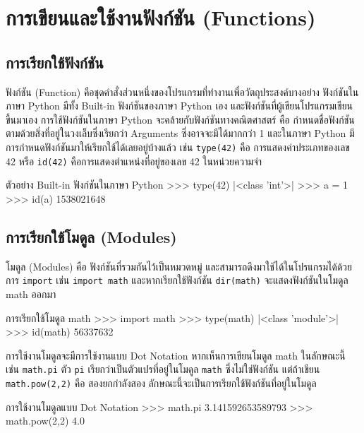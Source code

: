\chapter{การเขียนและใช้งานฟังก์ชัน (Functions)}
\section{การเรียกใช้ฟังก์ชัน}

ฟังก์ชัน (Function) คือชุดคำสั่งส่วนหนึ่งของโปรแกรมที่ทำงานเพื่อวัตถุประสงค์บางอย่าง ฟังก์ชันในภาษา Python มีทั้ง Built-in ฟังก์ชันของภาษา Python เอง และฟังก์ชันที่ผู้เขียนโปรแกรมเขียนขึ้นมาเอง การใช้ฟังก์ชันในภาษา Python จะคล้ายกับฟังก์ชันทางคณิตศาสตร์ คือ กำหนดชื่อฟังก์ชันตามด้วยสิ่งที่อยู่ในวงเล็บซึ่งเรียกว่า Arguments ซึ่งอาจจะมีได้มากกว่า 1 และในภาษา Python มีการกำหนดฟังก์ชันมาให้เรียกใช้ได้เลยอยู่บ้างแล้ว เช่น \texttt{type(42)} คือ การแสดงค่าประเภทของเลข 42 หรือ \texttt{id(42)} คือการแสดงตำแหน่งที่อยู่ของเลข 42 ในหน่วยความจำ

\begin{codelist}{ตัวอย่าง Built-in ฟังก์ชันในภาษา Python}{}
>>> type(42)
|<class \rq{}int\rq{}>|
>>> a = 1
>>> id(a)
1538021648
\end{codelist}


\section{การเรียกใช้โมดูล (Modules)}

โมดูล (Modules) คือ ฟังก์ชันที่รวมกันไว้เป็นหมวดหมู่ และสามารถดึงมาใช้ได้ในโปรแกรมได้ด้วยการ \texttt{import} เช่น \texttt{import math} และหากเรียกใช้ฟังก์ชัน \texttt{dir(math)} จะแสดงฟังก์ชันในโมดูล math ออกมา 

\begin{codelist}{การเรียกใช้โมดูล math}{}
>>> import math
>>> type(math)
|<class \rq{}module\rq{}>|
>>> id(math)
56337632

\end{codelist}


การใช้งานโมดูลจะมีการใช้งานแบบ Dot Notation หากเห็นการเขียนโมดูล math ในลักษณะนี้ เช่น  \texttt{math.pi} ตัว  \texttt{pi} เรียกว่าเป็นตัวแปรที่อยู่ในโมดูล  \texttt{math} ซึ่งไม่ใช่ฟังก์ชัน แต่ถ้าเขียน  \texttt{math.pow(2,2)} คือ สองยกกำลังสอง ลักษณะนี้จะเป็นการเรียกใช้ฟังก์ชันที่อยู่ในโมดูล

\begin{codelist}{การใช้งานโมดูลแบบ Dot Notation}{}
>>> math.pi
3.141592653589793
>>> math.pow(2,2)
4.0
\end{codelist}

